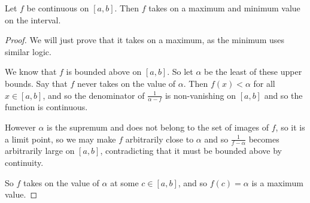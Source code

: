 \documentclass[]{article}
\begin{document}
\begin{thm}
		Let $f$ be continuous on $[a,b]$. Then $f$ takes on a maximum and minimum value on the interval.
\end{thm}

\begin{proof}
	We will just prove that it takes on a maximum, as the minimum uses similar logic.

	We know that $f$ is bounded above on $[a,b]$. So let $\alpha$ be the least of these upper bounds. Say that $f$ never takes on the value of $\alpha$. Then $f(x) < \alpha$ for all $x \in [a,b]$, and so the denominator of $\frac{1}{\alpha - f}$ is non-vanishing on $[a,b]$ and so the function is continuous.

	However $\alpha$ is the supremum and does not belong to the set of images of $f$, so it is a limit point, so we may make $f$ arbitrarily close to $\alpha$ and so $\frac{1}{f - \alpha}$ becomes arbitrarily large on $[a,b]$, contradicting that it must be bounded above by continuity.

	So $f$ takes on the value of $\alpha$ at some $c \in [a,b]$, and so $f(c) = \alpha$ is a maximum value.
\end{proof}
\end{document}
